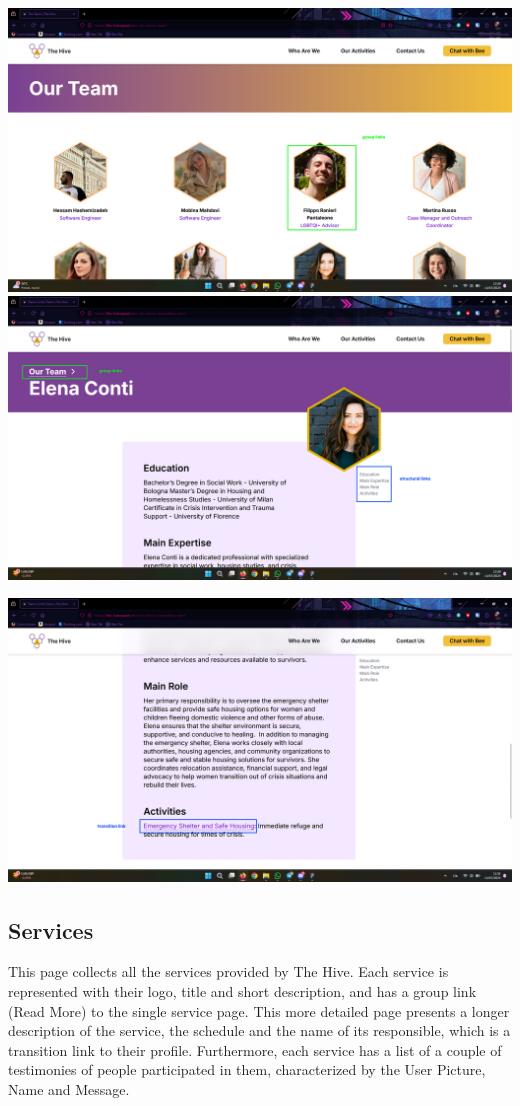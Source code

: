 \vspace{1em}
\includegraphics[width=0.5\linewidth]{img/design-document/website-screenshots/teampage.png}
\includegraphics[width=0.5\linewidth]{img/design-document/website-screenshots/personpage-1.png}
\begin{center}
    \includegraphics[width=0.5\linewidth]{img/design-document/website-screenshots/personpage-2.png}
\end{center}

\subsection{Services}
This page collects all the services provided by The Hive. Each service is represented with their logo, title and short description,
and has a group link (Read More) to the single service page. This more detailed page presents a longer description of the service, the schedule and
the name of its responsible, which is a transition link to their profile. Furthermore, each service has a list of a couple of testimonies of people
participated in them, characterized by the User Picture, Name and Message.


